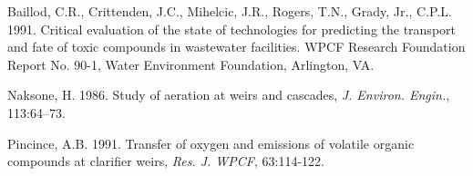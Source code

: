 
Baillod, C.R., Crittenden, J.C., Mihelcic, J.R., Rogers, T.N., Grady, Jr.,
C.P.L. 1991. Critical evaluation of the state of technologies for predicting
the transport and fate of toxic compounds in wastewater facilities. WPCF
Research Foundation Report No. 90-1, Water Environment Foundation, Arlington,
VA.

Naksone, H. 1986. Study of aeration at weirs and cascades, {\it J. Environ.
Engin.}, 113:64--73.

Pincince, A.B. 1991. Transfer of oxygen and emissions of volatile organic
compounds at clarifier weirs, {\it Res. J. WPCF}, 63:114-122.




\bye

 

